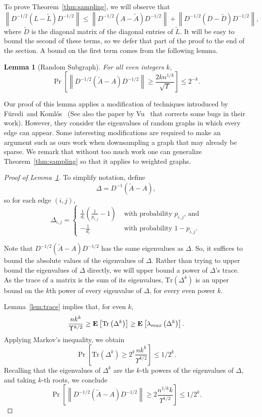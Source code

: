 \documentclass[11pt]{article}
\newtheorem{lemma}[theorem]{Lemma}
\newcommand{\Furedi}{F{\"u}redi}
\newcommand{\Komlos}{Koml{\'o}s}
\def\Dtil{\widetilde{D}}
\def\Ltil{\widetilde{L}}
\def\Atil{\widetilde{A}}
\def\trace#1{\mathrm{Tr} \left(#1 \right)}
\def\prob#1#2{\Pr_{#1}\left[ #2 \right]}
\def\expec#1#2{\mbox{\bf E}_{#1}\left[ #2 \right]}
\def\norm#1{\left\| #1 \right\|}
\begin{document}
To prove Theorem~\ref{thm:sampling}, we will observe that
\[
\norm{D^{-1/2} (L - \Ltil) D^{-1/2}}
\leq
\norm{D^{-1/2} (A - \Atil) D^{-1/2}}
+
\norm{D^{-1/2} (D - \Dtil) D^{-1/2}},
\]
where $\Dtil$ is the diagonal matrix of the diagonal entries of $\Ltil$.
It will be easy to bound the second of these terms, so we defer that part of the proof
  to the end of the section.
A bound on the first term comes from the following lemma.

\begin{lemma}[Random Subgraph]\label{lem:sampling}
For all even integers $k$,
\[
  \prob{}{\norm{D^{-1/2} (\Atil  - A) D^{-1/2}} \geq
 \frac{2 k n^{1/k} }
      {\sqrt{\Upsilon }}
         }
  \leq  2 ^{-k}.
\]
\end{lemma}

Our proof of this lemma applies a modification of techniques introduced
  by \Furedi \ and \Komlos~\cite{FurediKomlos} (See also the paper by
  Vu~\cite{Vu} that corrects some bugs in their work).
However, they consider the eigenvalues of random graphs in which
  every edge can appear.
Some interesting modifications are required to make an argument such
  as ours work when downsampling a graph that may already be sparse.
We remark that without too much work one can
  generalize Theorem~\ref{thm:sampling} so that it applies
  to weighted graphs.

\begin{proof}[Proof of Lemma~\ref{lem:sampling}]
To simplify notation, define
\[
\Delta  = D^{-1} (\Atil - A),
\]
so for each edge $(i,j)$,
\[
\Delta_{i,j} = \begin{cases}
\frac{1}{d_{i}} (\frac{1}{p_{i,j}} - 1)  &
 \text{ with probability $p_{i,j}$, and}
\\
- \frac{1}{d_{i}}
  &
 \text{ with probability $1- p_{i,j}$.}
\end{cases}
\]

Note that $D^{-1/2} (\Atil - A) D^{-1/2}$ has the same eigenvalues
  as $\Delta$.
So, it suffices to bound the absolute values of the eigenvalues of $\Delta$.
Rather than trying to upper bound the eigenvalues of $\Delta $
  directly, we will upper bound a power of $\Delta$'s trace.
As the trace of a matrix is the sum of its eigenvalues,
  $\trace{\Delta ^{k}}$ is an upper bound
  on the $k$th power of every eigenvalue of $\Delta$,
 for every even power $k$.

Lemma~\ref{lem:trace} implies that, for even $k$,
\[
\frac{n k^{k}}{\Upsilon^{k/2}}
\geq
\expec{}{\trace{\Delta^{k} }}
\geq
\expec{}{\lambda _{max}\left(\Delta^{k} \right)}.
\]
Applying Markov's inequality, we obtain
\[
\prob{}{\trace{\Delta^{k}} \geq  2^{k} \frac{n k^{k}}{\Upsilon^{k/2}}}
\leq
1/2^{k}.
\]
Recalling that
  the eigenvalues of $\Delta^{k}$ are the $k$-th powers of the eigenvalues of $\Delta$,
 and
  taking $k$-th roots, we conclude
\[
\prob{}{\norm{D^{-1/2} (\Atil  - A) D^{-1/2}} \geq 
  2 \frac{n^{1/k} k}{\Upsilon^{1/2}}}
\leq
1/2^{k}.
\]
\end{proof}
\end{document}
